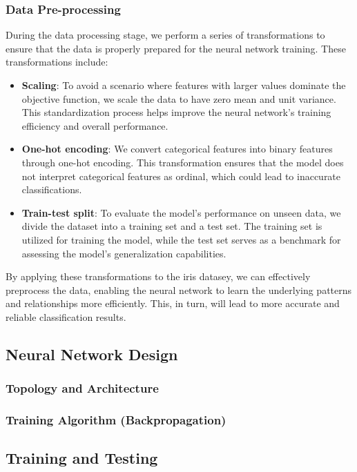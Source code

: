 \documentclass[conference]{inc/IEEEtran}
\begin{document}
\subsubsection{Data Pre-processing}
During the data processing stage, we perform a series of transformations to ensure that the data is properly prepared
for the neural network training. These transformations include:
\begin{itemize}
    \item \textbf{Scaling}: To avoid a scenario where features with larger values dominate the objective function, we scale the data to
    have zero mean and unit variance. This standardization process helps improve the neural network's training efficiency and
    overall performance.
    
    \item \textbf{One-hot encoding}: We convert categorical features into binary features through one-hot encoding. This transformation
    ensures that the model does not interpret categorical features as ordinal, which could lead to inaccurate classifications.
    
    \item \textbf{Train-test split}: To evaluate the model's performance on unseen data, we divide the dataset into a training set and a
    test set. The training set is utilized for training the model, while the test set serves as a benchmark for assessing the
    model's generalization capabilities.
\end{itemize}

By applying these transformations to the iris datasey, we can effectively preprocess the data, enabling the neural
network to learn the underlying patterns and relationships more efficiently. This, in turn, will lead to more accurate and
reliable classification results.
\subsection{Neural Network Design}

\subsubsection{Topology and Architecture}

\subsubsection{Training Algorithm (Backpropagation)}

\subsection{Training and Testing}
\end{document}
